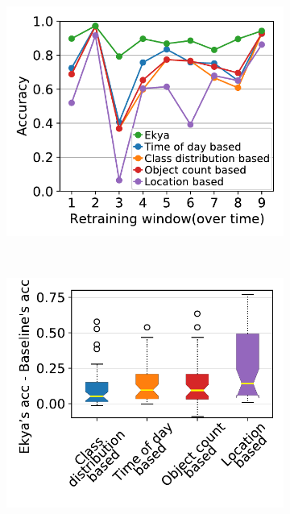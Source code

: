 \begin{figure}[t]
\captionsetup[subfigure]{justification=centering}
  \centering
  \begin{subfigure}[t]{0.48\linewidth}
    \centering
    \includegraphics[width=\linewidth]{ekya/results/reuse_cached_model/new_sf_060_069_golden_label.pdf}
    \caption{}
    \label{fig:reuse-cached-model-1}
  \end{subfigure}
  ~
  \begin{subfigure}[t]{0.48\linewidth}
    \centering
    \includegraphics[width=\linewidth]{ekya/results/reuse_cached_model/new_waymo_reuse_cached_model_boxplot.pdf} 

\end{subfigure}
\end{figure}
